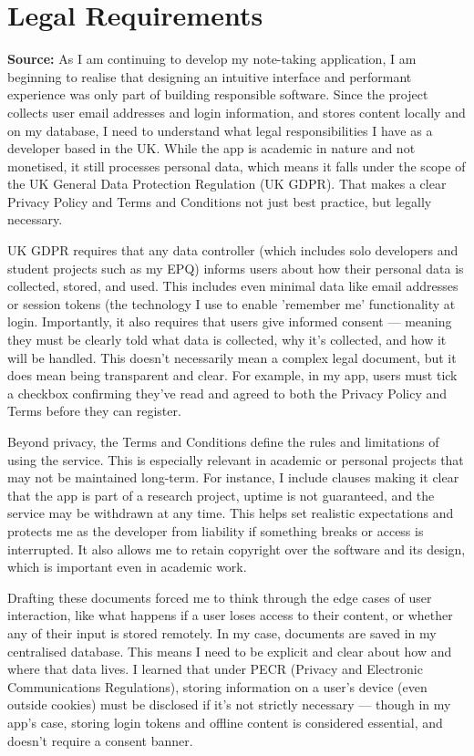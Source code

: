 \section{Legal Requirements}
\label{research:LegalRequirements}
\textbf{Source:} \cite{ICOOrganisations2025}
As I am continuing to develop my note-taking application, I am beginning to realise that designing an intuitive interface and performant experience was only part of building responsible software. Since the project collects user email addresses and login information, and stores content locally and on my database, I need to understand what legal responsibilities I have as a developer based in the UK. While the app is academic in nature and not monetised, it still processes personal data, which means it falls under the scope of the UK General Data Protection Regulation (UK GDPR). That makes a clear Privacy Policy and Terms and Conditions not just best practice, but legally necessary.

UK GDPR requires that any data controller (which includes solo developers and student projects such as my EPQ) informs users about how their personal data is collected, stored, and used. This includes even minimal data like email addresses or session tokens (the technology I use to enable 'remember me' functionality at login. Importantly, it also requires that users give informed consent — meaning they must be clearly told what data is collected, why it's collected, and how it will be handled. This doesn't necessarily mean a complex legal document, but it does mean being transparent and clear. For example, in my app, users must tick a checkbox confirming they've read and agreed to both the Privacy Policy and Terms before they can register.

Beyond privacy, the Terms and Conditions define the rules and limitations of using the service. This is especially relevant in academic or personal projects that may not be maintained long-term. For instance, I include clauses making it clear that the app is part of a research project, uptime is not guaranteed, and the service may be withdrawn at any time. This helps set realistic expectations and protects me as the developer from liability if something breaks or access is interrupted. It also allows me to retain copyright over the software and its design, which is important even in academic work.

Drafting these documents forced me to think through the edge cases of user interaction, like what happens if a user loses access to their content, or whether any of their input is stored remotely. In my case, documents are saved in my centralised database. This means I need to be explicit and clear about how and where that data lives. I learned that under PECR (Privacy and Electronic Communications Regulations), storing information on a user's device (even outside cookies) must be disclosed if it's not strictly necessary — though in my app's case, storing login tokens and offline content is considered essential, and doesn't require a consent banner.

